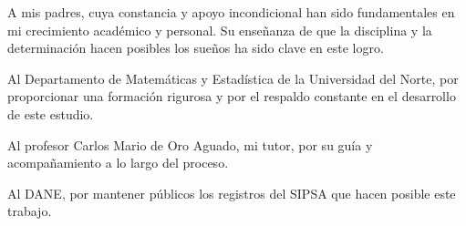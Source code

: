 \documentclass[
11pt,
english, %
openany, %
singlespacing,
headsepline,
]{MastersDoctoralThesis}
\begin{document}
\begin{acknowledgements}

A mis padres, cuya constancia y apoyo incondicional han sido fundamentales en mi crecimiento académico y personal. Su enseñanza de que la disciplina y la determinación hacen posibles los sueños ha sido clave en este logro.

Al Departamento de Matemáticas y Estadística de la Universidad del Norte, por proporcionar una formación rigurosa y por el respaldo constante en el desarrollo de este estudio.

Al profesor Carlos Mario de Oro Aguado, mi tutor, por su guía y acompañamiento a lo largo del proceso.

Al DANE, por mantener públicos los registros del SIPSA que hacen posible este trabajo.

\end{acknowledgements}
\end{document}
